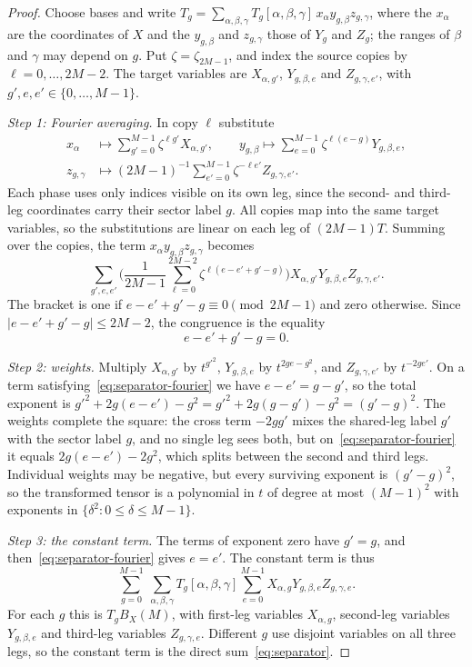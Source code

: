 \begin{proof}
Choose bases and write
\(T_g=\sum_{\alpha,\beta,\gamma}T_g[\alpha,\beta,\gamma]\,
x_\alpha y_{g,\beta}z_{g,\gamma}\), where the \(x_\alpha\) are the
coordinates of \(X\) and the \(y_{g,\beta}\) and \(z_{g,\gamma}\) those
of \(Y_g\) and \(Z_g\); the ranges of \(\beta\) and \(\gamma\) may depend
on \(g\). Put \(\zeta=\zeta_{2M-1}\), and index the source copies by
\(\ell=0,\ldots,2M-2\). The target variables are \(X_{\alpha,g'}\),
\(Y_{g,\beta,e}\) and \(Z_{g,\gamma,e'}\), with
\(g',e,e'\in\{0,\ldots,M-1\}\).

\emph{Step 1: Fourier averaging.} In copy \(\ell\) substitute
\begin{align*}
 x_\alpha&\longmapsto\sum_{g'=0}^{M-1}\zeta^{\ell g'}X_{\alpha,g'},\qquad
 y_{g,\beta}\longmapsto\sum_{e=0}^{M-1}\zeta^{\ell(e-g)}Y_{g,\beta,e},\\
 z_{g,\gamma}&\longmapsto(2M-1)^{-1}\sum_{e'=0}^{M-1}\zeta^{-\ell e'}
 Z_{g,\gamma,e'}.
\end{align*}
Each phase uses only indices visible on its own leg, since the second-
and third-leg coordinates carry their sector label \(g\). All copies map
into the same target variables, so the substitutions are linear on each
leg of \((2M-1)T\). Summing over the copies, the term
\(x_\alpha y_{g,\beta}z_{g,\gamma}\) becomes
\[
 \sum_{g',e,e'}\biggl(\frac1{2M-1}\sum_{\ell=0}^{2M-2}
 \zeta^{\ell(e-e'+g'-g)}\biggr)
 X_{\alpha,g'}Y_{g,\beta,e}Z_{g,\gamma,e'}.
\]
The bracket is one if \(e-e'+g'-g\equiv0\pmod{2M-1}\) and zero otherwise.
Since \(|e-e'+g'-g|\le2M-2\), the congruence is the equality
\begin{equation}\label{eq:separator-fourier}
 e-e'+g'-g=0.
\end{equation}

\emph{Step 2: weights.} Multiply \(X_{\alpha,g'}\) by \(t^{g'^2}\),
\(Y_{g,\beta,e}\) by \(t^{2ge-g^2}\), and \(Z_{g,\gamma,e'}\) by
\(t^{-2ge'}\). On a term satisfying~\eqref{eq:separator-fourier} we have
\(e-e'=g-g'\), so the total exponent is
\(g'^2+2g(e-e')-g^2=g'^2+2g(g-g')-g^2=(g'-g)^2\).
The weights complete the square: the cross term \(-2gg'\) mixes the
shared-leg label \(g'\) with the sector label \(g\), and no single leg
sees both, but on~\eqref{eq:separator-fourier} it equals
\(2g(e-e')-2g^2\), which splits between the second and third legs.
Individual weights may be negative, but every surviving exponent is
\((g'-g)^2\), so the transformed tensor is a polynomial in \(t\) of degree
at most \((M-1)^2\) with exponents in \(\{\delta^2:0\le\delta\le M-1\}\).

\emph{Step 3: the constant term.} The terms of exponent zero have
\(g'=g\), and then~\eqref{eq:separator-fourier} gives \(e=e'\). The
constant term is thus
\[
 \sum_{g=0}^{M-1}\ \sum_{\alpha,\beta,\gamma}T_g[\alpha,\beta,\gamma]
 \sum_{e=0}^{M-1}X_{\alpha,g}Y_{g,\beta,e}Z_{g,\gamma,e}.
\]
For each \(g\) this is \(T_gB_X(M)\), with first-leg variables
\(X_{\alpha,g}\), second-leg variables \(Y_{g,\beta,e}\) and third-leg
variables \(Z_{g,\gamma,e}\). Different \(g\) use disjoint variables on
all three legs, so the constant term is the direct
sum~\eqref{eq:separator}.
\end{proof}


